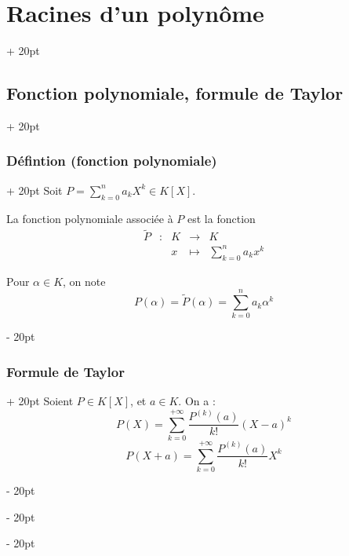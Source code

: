 \documentclass[a4paper, 12pt, twoside]{article}
\newcommand{\ind}[1][20pt]{\advance\leftskip + #1}
\newcommand{\deind}[1][20pt]{\advance\leftskip - #1}
\newenvironment{indt}[2][20pt]{#2 \par \ind[#1]}{\par \deind} %
\begin{document}
    \begin{indt}{\section{Racines d'un polynôme}}
        
        \begin{indt}{\subsection{Fonction polynomiale, formule de Taylor}}
            \begin{indt}{\subsubsection{Défintion (fonction polynomiale)}}
                Soit $\displaystyle P = \sum_{k = 0}^n a_k X^k \in K[X]$.
                
                \vspace{6pt}
                
                La fonction polynomiale associée à $P$ est la fonction
                    \[
                        \begin{array}{rcccc}
                            \widetilde P
                            & :
                            & K
                            & \longrightarrow
                            & K
                            \\
                            && x
                            & \longmapsto
                            & \displaystyle \sum_{k = 0}^n a_k x^k
                        \end{array}
                    \]
                
                Pour $\alpha \in K$, on note
                    \[ P(\alpha) = \widetilde P(\alpha) = \sum_{k = 0}^n a_k \alpha^k \]
            \end{indt}
            
            \vspace{6pt}
            
            \begin{indt}{\subsubsection{Formule de Taylor}}
                Soient $P \in K[X]$, et $a \in K$. On a :
                    \[ P(X) = \sum_{k = 0}^{+\infty} \dfrac{P^{(k)}(a)}{k!}(X - a)^k \]
                    \[ P(X + a) = \sum_{k = 0}^{+\infty} \dfrac{P^{(k)}(a)}{k!} X^k \]
            \end{indt}
            

\end{indt}
\end{indt}
\end{document}
